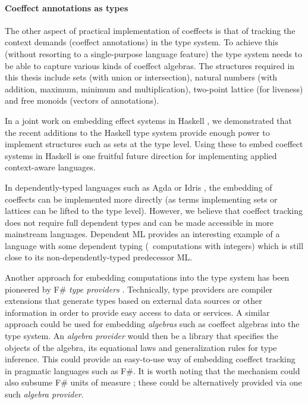 
\paragraph{Coeffect annotations as types}

The other aspect of practical implementation of coeffects is that of tracking the context demands
(coeffect annotations) in the type system. To achieve this (without resorting to a single-purpose
language feature) the type system needs to be able to capture various kinds of coeffect algebras.
The structures required in this thesis include sets (with union or intersection), natural numbers (with
addition, maximum, minimum and multiplication), two-point lattice (for liveness) and free monoids
(vectors of annotations).

In a joint work on embedding effect systems in Haskell \cite{effects-embedding}, we demonstrated that
the recent additions to the Haskell type system provide enough power to implement structures such
as sets at the type level. Using these to embed coeffect systems in Haskell is one fruitful
future direction for implementing applied context-aware languages.

In dependently-typed languages such as Agda or Idris \cite{other-agda,other-idris},
the embedding of coeffects can be implemented more directly (as terms implementing sets or lattices
can be lifted to the type level). However, we believe that coeffect tracking does not require full
dependent types and can be made accessible in more mainstream languages. Dependent ML
\cite{types-dependent-ml} provides an interesting example of a language with some dependent typing
(\eg~computations with integers) which is still close to its non-dependently-typed predecessor ML.

Another approach for embedding computations into the type system has been pioneered by F\#
\emph{type providers} \cite{app-inforich}. Technically, type providers are compiler extensions
that generate types based on external data sources or other information in order to provide easy
access to data or services. A similar approach could be used for embedding \emph{algebras} such
as coeffect algebras into the type system. An \emph{algebra provider} would then be a library that
specifies the objects of the algebra, its equational laws and generalization rules for type inference.
This could provide an easy-to-use way of embedding coeffect tracking in pragmatic languages
such as F\#. It is worth noting that the mechanism could also subsume F\# units of measure
\cite{types-units-of-measure}; these could be alternatively provided via one such \emph{algebra
provider}.


